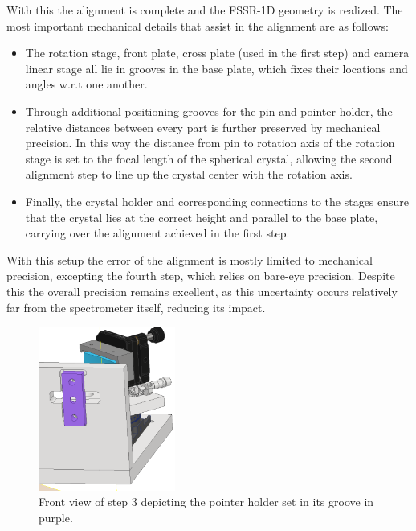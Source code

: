 With this the alignment is complete and the FSSR-1D geometry is realized. The 
most important mechanical details that assist in the alignment are as follows:
\begin{itemize}
	\item The rotation stage, front plate, cross plate (used in the first step) 
	and camera linear stage all lie in grooves in the base plate, which fixes 
	their locations and angles w.r.t one another. 
	\item Through additional positioning grooves for the pin and pointer 
	holder, the relative distances between every part is further preserved by 
	mechanical precision. In this way the distance from pin to rotation axis of 
	the rotation stage is set to the focal length of the spherical crystal, 
	allowing the second alignment step to line up the crystal center with the 
	rotation axis. 
	\item Finally, the crystal holder and corresponding connections to the 
	stages ensure that the crystal lies at the correct height and parallel to 
	the base plate, carrying over the alignment achieved in the first step. 
\end{itemize}

With this setup the error of the alignment is mostly limited to mechanical 
precision, excepting the fourth step, which relies on bare-eye precision. 
Despite this the overall precision remains excellent, as this uncertainty 
occurs relatively far from the spectrometer itself, reducing its 
impact.  

\begin{figure}[H]
	\centering
	\includegraphics[width=0.4\textwidth]{InventorPics/Alignment3.PNG}
	\caption{Front view of step 3 depicting the pointer 
		holder set in 
		its groove in purple.}
	\label{InvFSSRAlignment3}
\end{figure}

